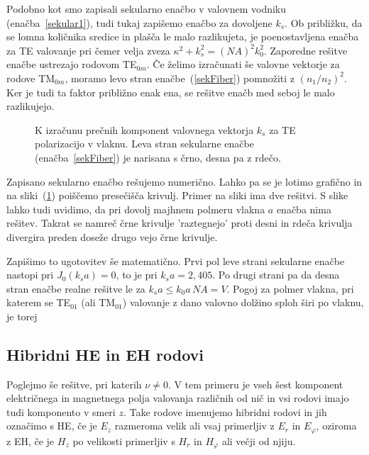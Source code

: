 Podobno kot smo zapisali sekularno enačbo v valovnem vodniku (enačba~\ref{sekular1}), tudi tukaj
zapišemo enačbo za dovoljene $k_s$. 
Ob približku, da se lomna količnika 
sredice in plašča le malo razlikujeta, je poenostavljena enačba za TE valovanje
pri čemer velja zveza $\kappa^2+k_s^2=(NA)^2k_0^2$. Zaporedne rešitve enačbe ustrezajo rodovom TE$_{0m}$. 
Če želimo izračunati še valovne vektorje za rodove TM$_{0m}$, moramo levo stran enačbe~(\ref{sekFiber}) pomnožiti
z $(n_1/n_2)^2$. Ker je tudi ta faktor približno enak ena, se rešitve enačb med seboj le malo razlikujejo.
\begin{figure}[h]
\centering
\def\svgwidth{90truemm} 

\caption{K izračunu prečnih komponent valovnega vektorja $k_s$ za TE polarizacijo v vlaknu.
Leva stran sekularne enačbe (enačba~\ref{sekFiber}) je narisana s črno, desna pa z rdečo.}
\label{fig:TEsecFib}
\end{figure} 

Zapisano sekularno enačbo rešujemo numerično. Lahko pa se je lotimo grafično in 
na sliki~(\ref{fig:TEsecFib}) poiščemo presečišča krivulj. Primer na sliki ima dve rešitvi. S slike lahko 
tudi uvidimo, da pri dovolj majhnem polmeru vlakna $a$ enačba nima rešitev. Takrat se namreč
črne krivulje 'raztegnejo' proti desni in rdeča krivulja divergira preden doseže drugo vejo črne krivulje.

Zapišimo to ugotovitev še matematično. Prvi pol leve strani sekularne enačbe nastopi pri 
$J_0 (k_s a)  = 0$, to je pri $k_s a= 2,405$. 
Po drugi strani pa da desna stran enačbe realne rešitve le za $k_s a \le k_0 a\,NA = V$.
Pogoj za polmer vlakna, pri katerem se TE$_{01}$ (ali TM$_{01}$) valovanje z dano valovno dolžino sploh širi po 
vlaknu, je torej 

\subsection*{Hibridni HE in EH rodovi}
Poglejmo še rešitve, pri katerih $\nu \neq 0$. V tem primeru je 
vseh šest komponent električnega in magnetnega polja valovanja različnih od nič in vsi rodovi
imajo tudi komponento v smeri $z$. Take rodove imenujemo hibridni rodovi in jih 
označimo s HE, če je $E_z$ razmeroma velik ali vsaj primerljiv z $E_r$ in $E_\varphi$, 
oziroma z EH, če je $H_z$ po velikosti primerljiv s $H_r$ in $H_\varphi$ ali večji od njiju. 

